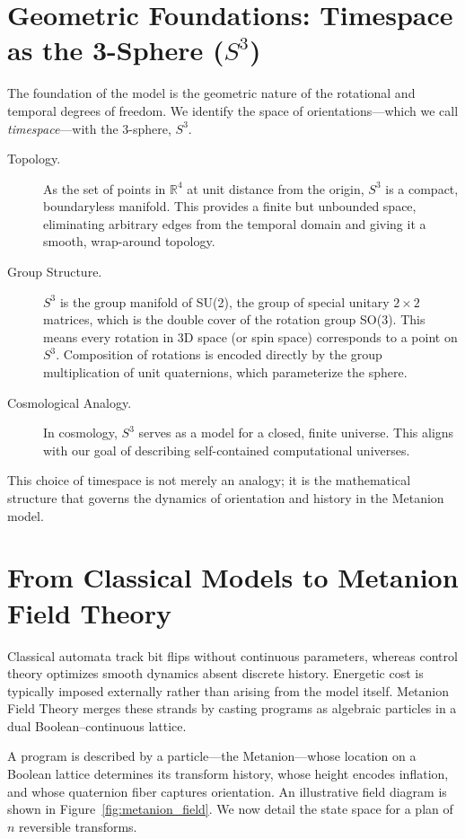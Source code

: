 \documentclass{article}
\begin{document}
\section{Geometric Foundations: Timespace as the 3-Sphere ($S^3$)}
The foundation of the model is the geometric nature of the rotational and temporal degrees of freedom. We identify the space of orientations---which we call \emph{timespace}---with the 3-sphere, $S^3$.
\begin{description}
  \item[Topology.] As the set of points in $\mathbb{R}^4$ at unit distance from the origin, $S^3$ is a compact, boundaryless manifold. This provides a finite but unbounded space, eliminating arbitrary edges from the temporal domain and giving it a smooth, wrap-around topology.
  \item[Group Structure.] $S^3$ is the group manifold of SU(2), the group of special unitary $2 \times 2$ matrices, which is the double cover of the rotation group SO(3). This means every rotation in 3D space (or spin space) corresponds to a point on $S^3$. Composition of rotations is encoded directly by the group multiplication of unit quaternions, which parameterize the sphere.
  \item[Cosmological Analogy.] In cosmology, $S^3$ serves as a model for a closed, finite universe. This aligns with our goal of describing self-contained computational universes.
\end{description}
This choice of timespace is not merely an analogy; it is the mathematical structure that governs the dynamics of orientation and history in the Metanion model.

\section{From Classical Models to Metanion Field Theory}
Classical automata track bit flips without continuous parameters, whereas control theory optimizes smooth dynamics absent discrete history. Energetic cost is typically imposed externally rather than arising from the model itself. Metanion Field Theory merges these strands by casting programs as algebraic particles in a dual Boolean--continuous lattice.

A program is described by a particle---the Metanion---whose location on a Boolean lattice determines its transform history, whose height encodes inflation, and whose quaternion fiber captures orientation. An illustrative field diagram is shown in Figure~\ref{fig:metanion_field}. We now detail the state space for a plan of $n$ reversible transforms.
\end{document}
